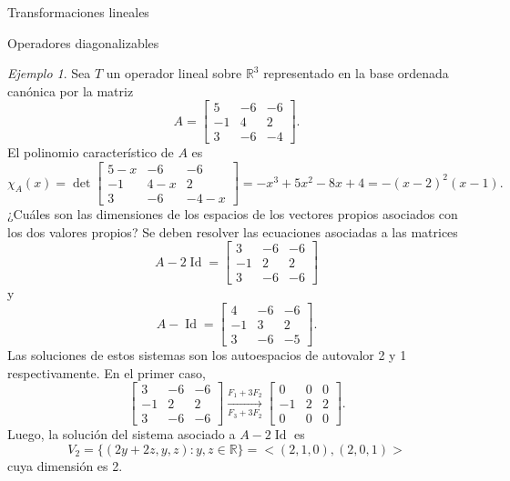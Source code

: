\documentclass[a4paper,12pt,twoside,spanish,reqno]{amsbook}
\numberwithin{equation}{section}
\theoremstyle{definition}
\theoremstyle{remark}
\newtheorem*{ejemplo*}{Ejemplo}
\newcommand{\Id}{\operatorname{Id}}
\newcommand{\R}{\mathbb R}
\begin{document}
\begin{chapter}{Transformaciones lineales}
\begin{section}{Operadores diagonalizables}
        \begin{ejemplo*}
            Sea $T$ un operador lineal sobre $\R^3$  representado en la base ordenada canónica por la matriz
            \begin{equation*}
                A = 
                \begin{bmatrix}
                5 &-6 &-6\\ -1& 4& 2\\3 &-6& -4
                \end{bmatrix}.
            \end{equation*}
            El  polinomio característico de $A$ es
            \begin{equation*}
                \chi_A(x) = \det \begin{bmatrix}
                    5-x &-6 &-6\\ -1& 4-x& 2\\3 &-6& -4-x
                \end{bmatrix} 
                = -x^3 + 5 x^2 - 8 x + 4 = -(x-2)^2(x-1).
            \end{equation*}
            ¿Cuáles son las dimensiones de los espacios de los vectores propios asociados
            con los dos valores propios? Se deben resolver las ecuaciones asociadas a las matrices
            \begin{equation*}
            A - 2 \Id = 
            \begin{bmatrix}
            3 &-6 &-6\\ -1& 2& 2\\3 &-6& -6
            \end{bmatrix} 
            \end{equation*}
            y 
            \begin{equation*}
            A -\Id= 
            \begin{bmatrix}
            4 &-6 &-6\\ -1& 3& 2\\3 &-6& -5
            \end{bmatrix}.
            \end{equation*}
            Las soluciones de estos sistemas son los autoespacios de autovalor 2 y 1 respectivamente. En  el primer caso, 
            \begin{equation*}
            \begin{bmatrix} 3 &-6 &-6\\ -1& 2& 2\\3 &-6& -6 \end{bmatrix}
            \underset{F_3+3F_2}{\stackrel{F_1+3 F_2}{\longrightarrow}} 
            \begin{bmatrix} 0 &0 &0\\ -1& 2& 2\\0 &0& 0 \end{bmatrix}.
            \end{equation*}
            Luego,  la solución del sistema asociado a $A-2\Id$ es 
            $$
            V_2 = \{(2y+2z,y,z): y,z \in \R\} = <(2,1,0),(2,0,1)>
            $$
            cuya dimensión es 2. 
            

\end{ejemplo*}
\end{section}
\end{chapter}
\end{document}
